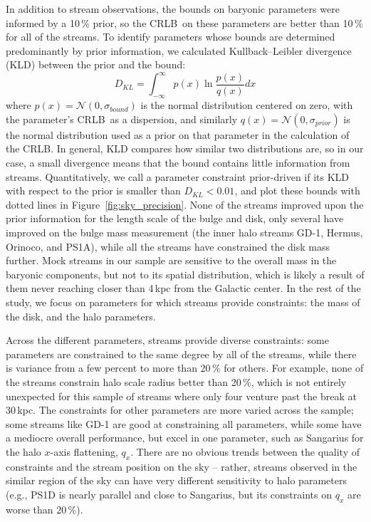 \documentclass[modern]{aastex61}
\newcommand{\acronym}[1]{{\small{#1}}}
\newcommand{\CRLB}{\acronym{CRLB}}
\begin{document}
In addition to stream observations, the bounds on baryonic parameters were informed by a 10\,\% prior, so the \CRLB\ on these parameters are better than 10\,\% for all of the streams.
To identify parameters whose bounds are determined predominantly by prior information, we calculated Kullback--Leibler divergence (KLD) between the prior and the bound:
\begin{equation*}
D_{KL} = \int_{-\infty}^{\infty} p(x) \ln\frac{p(x)}{q(x)} dx
\end{equation*}
where $p(x) = \mathcal{N}(0,\sigma_{bound})$ is the normal distribution centered on zero, with the parameter's \CRLB\ as a dispersion, and similarly $q(x) = \mathcal{N}(0,\sigma_{prior})$ is the normal distribution used as a prior on that parameter in the calculation of the \CRLB.
In general, KLD compares how similar two distributions are, so in our case, a small divergence means that the bound contains little information from streams.
Quantitatively, we call a parameter constraint prior-driven if its KLD with respect to the prior is smaller than $D_{KL}<0.01$, and plot these bounds with dotted lines in Figure~\ref{fig:sky_precision}.
None of the streams improved upon the prior information for the length scale of the bulge and disk, only several have improved on the bulge mass measurement (the inner halo streams GD-1, Hermus, Orinoco, and PS1A), while all the streams have constrained the disk mass further.
Mock streams in our sample are sensitive to the overall mass in the baryonic components, but not to its spatial distribution, which is likely a result of them never reaching closer than 4\,kpc from the Galactic center.
In the rest of the study, we focus on parameters for which streams provide constraints: the mass of the disk, and the halo parameters.

Across the different parameters, streams provide diverse constraints: some parameters are constrained to the same degree by all of the streams, while there is variance from a few percent to more than 20\,\% for others.
For example, none of the streams constrain halo scale radius better than 20\,\%, which is not entirely unexpected for this sample of streams where only four venture past the break at 30\,kpc.
The constraints for other parameters are more varied across the sample; some streams like GD-1 are good at constraining all parameters, while some have a mediocre overall performance, but excel in one parameter, such as Sangarius for the halo $x$-axis flattening, $q_x$.
There are no obvious trends between the quality of constraints and the stream position on the sky -- rather, streams observed in the similar region of the sky can have very different sensitivity to halo parameters (e.g., PS1D is nearly parallel and close to Sangarius, but its constraints on $q_x$ are worse than 20\,\%).
\end{document}
